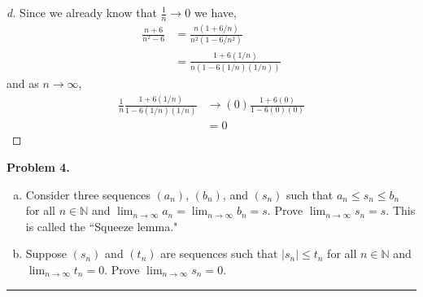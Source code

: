 \documentclass[leqno]{article}
\theoremstyle{nonumberplain}
\newtheorem{proof}{Proof}
\begin{document}
\begin{proof}[d]
Since we already know that $\frac{1}{n} \to 0$ we have,
\begin{align*}
\frac{n+6}{n^2-6} &= \frac{n(1+6/n)}{n^2(1-6/n^2)}\\
&=\frac{1+6(1/n)}{n(1-6(1/n)(1/n))}
\end{align*}
and as $n \to \infty$,
\begin{align*}
\frac{1}{n}\frac{1+6(1/n)}{1-6(1/n)(1/n)} &\to (0)\frac{1+6(0)}{1-6(0)(0)}\\
&= 0
\end{align*}
\end{proof}

\pagebreak




\noindent\textbf{Problem 4.} 

\begin{enumerate}[(a)]
\item
Consider three sequences $(a_n)$, $(b_n)$, and $(s_n)$ such that $a_n \leq s_n \leq b_n$ for all $n\in \mathbb{N}$ and $\lim_{n \to \infty} a_n= \lim_{n \to \infty} b_n = s$. Prove $\lim_{n \to \infty} s_n = s$. This is called the ``Squeeze lemma."
\item
Suppose $(s_n)$ and $(t_n)$ are sequences such that $|s_n| \leq t_n$ for all $n \in \mathbb{N}$ and $\lim_{n \to \infty} t_n =0$. Prove $\lim_{n \to \infty} s_n = 0$. 
\end{enumerate}

\noindent\rule[0.5ex]{\linewidth}{1pt}
\end{document}
